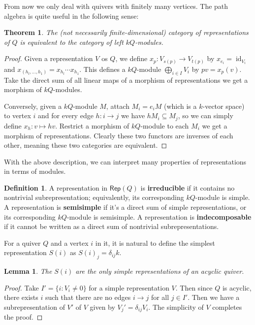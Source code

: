 \documentclass[12pt]{report}
\newtheorem{theorem}{Theorem}[section]
\newtheorem{lemma}{Lemma}[section]
\theoremstyle{remark}
\theoremstyle{definition}
\newtheorem{definition}{Definition}[section]
\newcommand{\id}[0]{\operatorname{id}}
\newcommand{\Rep}[0]{\mathsf{Rep}}
\begin{document}
    From now we only deal with quivers with finitely many vertices. The path algebra is quite useful in the following sense:
    \begin{theorem}
        The (not necessarily finite-dimensional) category of representations of $Q$ is equivalent to the category of left $kQ$-modules.
    \end{theorem}
    \begin{proof}
        Given a representation $V$ os $Q$, we define $x_p:V_{s(p)}\to V_{t(p)}$ by $x_{e_i}=\id_{V_i}$ and $x_{(h_l,\dots, h_1)}=x_{h_l}\cdots x_{h_1}$. This defines a $kQ$-module $\bigoplus_{i\in I}V_i$ by $pv=x_p(v)$. Take the direct sum of all linear maps of a morphism of representations we get a morphism of $kQ$-modules.

        Conversely, given a $kQ$-module $M$, attach $M_i=e_iM$ (which is a $k$-vector space) to vertex $i$ and for every edge $h:i\to j$ we have $hM_i\subseteq M_j$, so we can simply define $x_h:v\mapsto hv$. Restrict a morphism of $kQ$-module to each $M_i$ we get a morphism of representations. Clearly these two functors are inverses of each other, meaning these two categories are equivalent.
    \end{proof}
    With the above description, we can interpret many properties of representations in terms of modules.
    \begin{definition}
        A representation in $\Rep(Q)$ is \textbf{irreducible} if it contains no nontrivial subrepresentation; equivalently, its corresponding $kQ$-module is simple. A representation is \textbf{semisimple} if it's a direct sum of simple representations, or its corresponding $kQ$-module is semisimple. A representation is \textbf{indecomposable} if it cannot be written as a direct sum of nontrivial subrepresentations.
    \end{definition}
    For a quiver $Q$ and a vertex $i$ in it, it is natural to define the simplest representation $S(i)$ as $S(i)_j=\delta_{ij}k$.
    \begin{lemma}
        The $S(i)$ are the only simple representations of an acyclic quiver.
    \end{lemma}
    \begin{proof}
        Take $I'=\{i:V_i\neq 0\}$ for a simple representation $V$. Then since $Q$ is acyclic, there exists $i$ such that there are no edges $i\to j$ for all $j\in I'$. Then we have a subrepresentation of $V'$ of $V$ given by $V_j'=\delta_{ij}V_i$. The simplicity of $V$ completes the proof.
    \end{proof}
\end{document}
